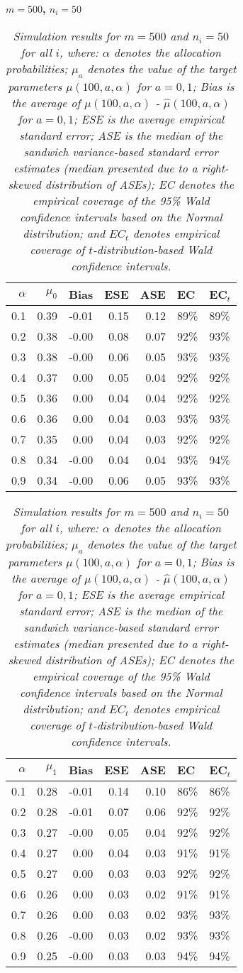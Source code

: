 \documentclass[12pt, letterpaper]{article}
\begin{document}
\begin{center}
	\textbf{$m=500$, $n_i=50$} 
\end{center}
\begin{table}[ht!]
	\centering
	\bgroup
	\def\arraystretch{1.25}
	\setlength\tabcolsep{0.05in}
	\begin{tabular}{rrrrrll}
		\hline
		$\alpha$ & $\mu_0$ & Bias & ESE & ASE & EC & EC$_t$ \\ 
		\hline
		0.1 & 0.39 & -0.01 & 0.15 & 0.12 & 89\% & 89\% \\ 
  0.2 & 0.38 & -0.00 & 0.08 & 0.07 & 92\% & 93\% \\ 
  0.3 & 0.38 & -0.00 & 0.06 & 0.05 & 93\% & 93\% \\ 
  0.4 & 0.37 & 0.00 & 0.05 & 0.04 & 92\% & 92\% \\ 
  0.5 & 0.36 & 0.00 & 0.04 & 0.04 & 92\% & 92\% \\ 
  0.6 & 0.36 & 0.00 & 0.04 & 0.03 & 93\% & 93\% \\ 
  0.7 & 0.35 & 0.00 & 0.04 & 0.03 & 92\% & 92\% \\ 
  0.8 & 0.34 & -0.00 & 0.04 & 0.04 & 93\% & 94\% \\ 
  0.9 & 0.34 & -0.00 & 0.06 & 0.05 & 93\% & 93\% \\ 
		\hline
	\end{tabular}
	\egroup
	\quad 
	\bgroup
	\setlength\tabcolsep{0.05in}
	\def\arraystretch{1.25}
	\begin{tabular}{rrrrrll}
		\hline
		$\alpha$ & $\mu_1$ & Bias & ESE & ASE & EC & EC$_t$ \\
		\hline
		0.1 & 0.28 & -0.01 & 0.14 & 0.10 & 86\% & 86\% \\ 
  0.2 & 0.28 & -0.01 & 0.07 & 0.06 & 92\% & 92\% \\ 
  0.3 & 0.27 & -0.00 & 0.05 & 0.04 & 92\% & 92\% \\ 
  0.4 & 0.27 & 0.00 & 0.04 & 0.03 & 91\% & 91\% \\ 
  0.5 & 0.27 & 0.00 & 0.03 & 0.03 & 92\% & 92\% \\ 
  0.6 & 0.26 & 0.00 & 0.03 & 0.02 & 91\% & 91\% \\ 
  0.7 & 0.26 & 0.00 & 0.03 & 0.02 & 93\% & 93\% \\ 
  0.8 & 0.26 & -0.00 & 0.03 & 0.02 & 93\% & 93\% \\ 
  0.9 & 0.25 & -0.00 & 0.03 & 0.03 & 94\% & 94\% \\ 
		\hline
	\end{tabular}
	\egroup
	\caption*{\textit{Simulation results for $m = 500$ and $n_i = 50$ for all $i$, where: $\alpha$ denotes the allocation probabilities; $\mu_a$ denotes the value of the target parameters $\mu(100, a, \alpha)$ for $a=0,1$; Bias is the average of $\mu(100, a, \alpha)$ - $\hat{\mu}(100, a, \alpha)$ for $a=0, 1$; ESE is the average empirical standard error; ASE is the median of the sandwich variance-based standard error estimates (median presented due to a right-skewed distribution of ASEs); EC denotes the empirical coverage of the 95\% Wald confidence intervals based on the Normal distribution; and $EC_t$ denotes empirical coverage of $t$-distribution-based Wald confidence intervals.}}
\end{table}
\end{document}
